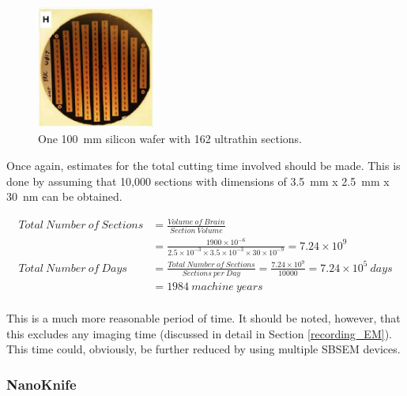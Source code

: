\documentclass[a4paper, 11pt]{article}
\numberwithin{equation}{section}
\begin{document}
	\begin{figure}[h]
		\centering
		\includegraphics[width=0.35\textwidth]{silicon_wafer}
		\caption{One \SI{100}{\milli\meter} silicon wafer with 162 ultrathin sections. \cite{hayworth2014atum}}
		\label{silicon_wafer}
	\end{figure}
	
	Once again, estimates for the total cutting time involved should be made. This is done by assuming that 10,000 sections with dimensions of \SI{3.5}{\milli\meter} x \SI{2.5}{\milli\meter} x \SI{30}{\nano\meter} can be obtained.
	
\begin{align}
Total\ Number\ of\ Sections &= \frac{Volume\ of\ Brain}{Section\ Volume} \nonumber \\
&= \frac{1900\times10^{-6}}{2.5\times10^{-3} \times 3.5\times10^{-3} \times 30\times10^{-9}} = 7.24\times10^{9} \nonumber \\
Total\ Number\ of\ Days &= \frac{Total\ Number\ of\ Sections}{Sections\ per\ Day} = \frac{7.24\times10^9}{10000} = 7.24\times10^{5}\ days \nonumber \\
&= 1984\ machine\ years \nonumber \\
\end{align}

This is a much more reasonable period of time. It should be noted, however, that this excludes any imaging time (discussed in detail in Section \ref{recording_EM}). This time could, obviously, be further reduced by using multiple SBSEM devices.
\newpage

	\subsubsection{NanoKnife}
		\pagestyle{john}
	
\end{document}
